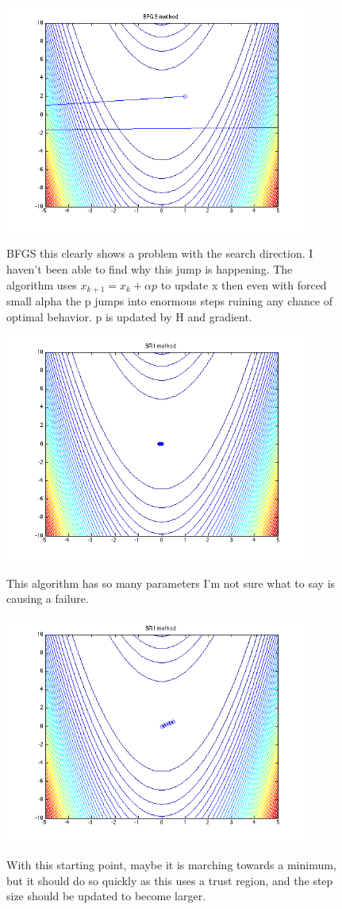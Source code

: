 \documentclass[7pt]{article}
\begin{document}
\begin{figure}
	\includegraphics[width = 10cm]{bfgs21}\\
	\caption{BFGS this clearly shows a problem with the search direction. I haven't been able to find why this jump is happening. The algorithm uses $x_{k+1}= x_{k} + \alpha p$ to update x then even with forced small alpha the p jumps into enormous steps ruining any chance of optimal behavior. p is updated by H and gradient. }
\end{figure}
\begin{figure}
	\includegraphics[width = 10cm]{sr1zero}\\
	\caption{This algorithm has so many parameters I'm not sure what to say is causing a failure.}
\end{figure}
\begin{figure}
	\includegraphics[width = 10cm]{sr10}\\
	\caption{With this starting point, maybe it is marching towards a minimum, but it should do so quickly as this uses a trust region, and the step size should be updated to become larger.}
\end{figure}
		
\end{document}
